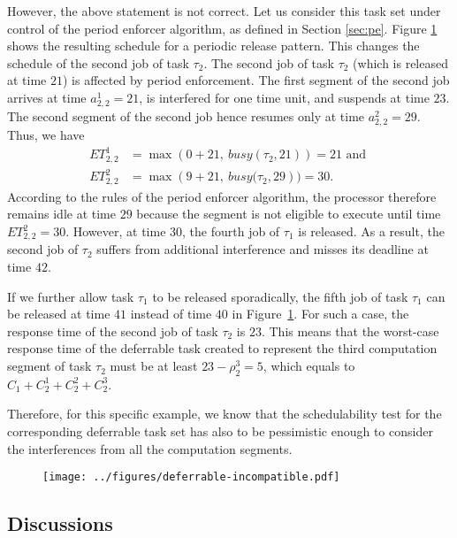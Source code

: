 However, the above statement is not correct. Let us consider this task set under control of the period enforcer algorithm, as defined in Section \ref{sec:pe}.
Figure \ref{fig:example-deferrable-incompatible} shows the resulting schedule for a periodic release pattern. This changes the schedule of the second job of task $\tau_2$. 
The second job of task $\tau_2$ (which is released at time $21$) is affected by period enforcement. The first segment of the second job arrives at time $a^1_{2,2} = 21$, is interfered for one time unit, and suspends at time $23$. The  second segment of the second job hence resumes only at time $a^2_{2,2} = 29$. Thus, we have
\begin{align*}
	ET_{2,2}^1 & = \max\left(0 + 21,\ \mathit{busy}(\tau_2, 21)\right) = 21  \text{ and }
\\
	ET_{2,2}^2 & = \max\left(9 + 21,\ \mathit{busy}(\tau_2, 29\right) ) = 30.
\end{align*}
According to the rules of the period enforcer algorithm, the processor therefore remains idle at time $29$ because the segment is not eligible to execute until time $ET_{2,2}^2 = 30$. However, at time $30$, the fourth job of $\tau_1$ is released. As a result, the second job of $\tau_2$ suffers from additional interference and misses its deadline at time $42$.

If we further allow task $\tau_1$ to be released sporadically, the fifth job of task $\tau_1$ can be released at time $41$ instead of time $40$ in Figure~\ref{fig:example-deferrable-incompatible}. For such a case, the response time of the second job of task $\tau_2$ is $23$. This means that the worst-case response time of the deferrable task created to represent the third computation segment of task $\tau_2$ must be at least $23-\rho_2^3=5$, which equals to $C_1 + C_2^1+C_2^2+C_2^3$.

Therefore, for this specific example, we know that the schedulability test for the  corresponding deferrable task set has also to be pessimistic enough to consider the interferences from all the computation segments.

\begin{figure}[t]
  \centering
  \texttt{[image: ../figures/deferrable-incompatible.pdf]}
  \caption{}
  \label{fig:example-deferrable-incompatible}
\end{figure}

\subsection{Discussions}
\label{sec:discussions-deferrable}

